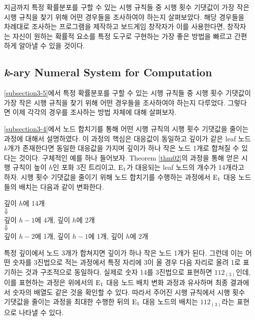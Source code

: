 \documentclass[11pt]{article}
\begin{document}
지금까지 특정 확률분포를 구할 수 있는 시행 규칙들 중 시행 횟수 기댓값이 가장 작은 시행 규칙을 찾기 위해 어떤 경우들을 조사하여야 하는지 살펴보았다. 해당 경우들을 차례대로 조사하는 프로그램을 제작하고 보드게임 창작자가 이를 사용한다면, 창작자는 자신이 원하는 확률적 요소를 특정 도구로 구현하는 가장 좋은 방법을 빠르고 간편하게 알아낼 수 있을 것이다.

\subsection{\textit{k}-ary Numeral System for Computation} \label{subsection3-6}
\ref{subsection3-5}에서 특정 확률분포를 구할 수 있는 시행 규칙들 중 시행 횟수 기댓값이 가장 작은 시행 규칙을 찾기 위해 어떤 경우들을 조사하여야 하는지 다루었다. 그렇다면 이제 각각의 경우를 조사하는 방법 자체에 대해 살펴보자.

\ref{subsection3-4}에서 노드 합치기를 통해 어떤 시행 규칙의 시행 횟수 기댓값을 줄이는 과정에 대해서 설명하였다. 이 과정의 핵심은 대응값이 동일하고 깊이가 같은 leaf 노드 $k$개가 존재한다면 동일한 대응값을 가지며 깊이가 하나 작은 노드 1개로 합쳐질 수 있다는 것이다. 구체적인 예를 하나 들어보자. Theorem \ref{thm02}의 과정을 통해 얻은 시행 규칙이 높이 $h$인 포화 3진 트리이고, $\textnormal{E}_{1}$가 대응되는 leaf 노드의 개수가 14개라고 하자. 시행 횟수 기댓값을 줄이기 위해 노드 합치기를 수행하는 과정에서 $\textnormal{E}_{1}$ 대응 노드들의 배치는 다음과 같이 변화한다.

\begin{center}
깊이 $h$에 14개\\
$\Large \Downarrow$ \\
깊이 $h-1$에 4개, 깊이 $h$에 2개\\
$\Large \Downarrow$ \\
깊이 $h-2$에 1개, 깊이 $h-1$에 1개, 깊이 $h$에 2개
\end{center}
\doublespacing

특정 깊이에서 노드 3개가 합쳐지면 깊이가 하나 작은 노드 1개가 된다. 그런데 이는 어떤 숫자를 3진법으로 적는 과정에서 특정 자리에 3이 올 경우 다음 자리로 올려 1로 표기하는 것과 구조적으로 동일하다. 실제로 숫자 14를 3진법으로 표현하면 $112_{(3)}$인데, 이를 표현하는 과정은 위에서의 $\textnormal{E}_{1}$ 대응 노드 배치 변화 과정과 유사하며 최종 결과에서 숫자의 배열도 같은 것을 확인할 수 있다. 따라서 주어진 시행 규칙에서 시행 횟수 기댓값을 줄이는 과정을 최대한 수행한 뒤의 $\textnormal{E}_{1}$ 대응 노드의 배치는 $112_{(3)}$라는 표현으로 나타낼 수 있다.
\end{document}
